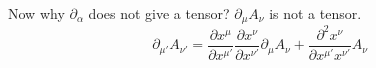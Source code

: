 Now why $\partial_{\alpha }$ does not give a tensor? $\partial_{\mu }A_{\nu }$ is not a tensor.
\[
	\partial_{\mu '}A_{\nu '} = \frac{\partial x^{\mu }}{\partial x^{\mu '}} \frac{\partial x^{\nu }}{\partial x^{\nu '}} \partial_{\mu } A_{\nu } + \frac{\partial^{2}x^{\nu }}{\partial x^{\mu '}x^{\nu '}} A_{\nu }
\]

